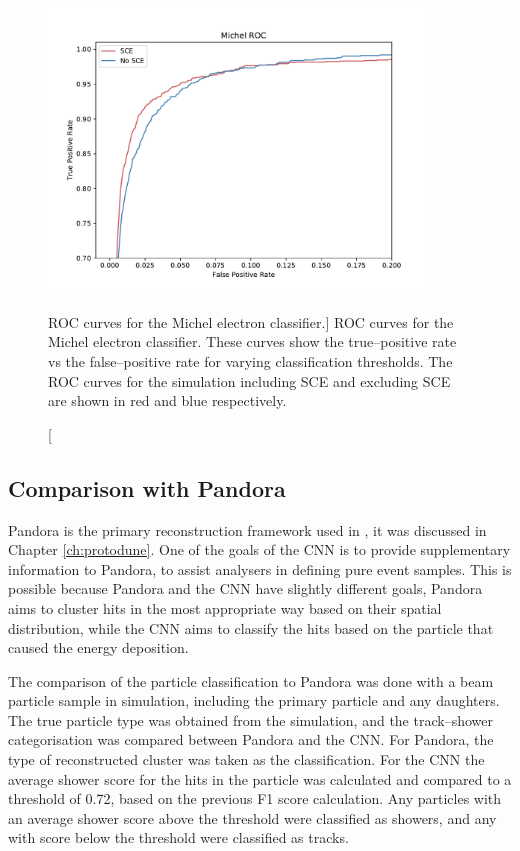 \begin{figure}
	\centering
	\includegraphics[width=0.9\textwidth]{figures/michel_roc_comparison.pdf}
	\caption
	[ROC curves for the Michel electron classifier.]
	{ROC curves for the Michel electron classifier. These curves show
	the true--positive rate vs the false--positive rate for varying classification
	thresholds. The ROC curves for the \protodune{} simulation including SCE and
	excluding SCE are shown in red and blue respectively.}
	\label{fig:michel_roc}
\end{figure}

\subsection{Comparison with Pandora}
Pandora is the primary reconstruction framework used in \protodune{}, it was
discussed in Chapter \ref{ch:protodune}. One of the goals of the CNN is to
provide supplementary information to Pandora, to assist analysers in defining 
pure event samples. This is possible because Pandora and the CNN have slightly
different goals, Pandora aims to cluster hits in the most appropriate way based
on their spatial distribution, while the CNN aims to classify the hits based on 
the particle that caused the energy deposition.

The comparison of the particle classification to Pandora was done with a beam 
particle sample in \protodune{} simulation, including the primary particle and 
any daughters. The true particle type was obtained from the simulation, and 
the track--shower categorisation was compared between Pandora and the CNN. For 
Pandora, the type of reconstructed cluster was taken as the classification. 
For the CNN the average shower score for the hits in the particle was 
calculated and compared to a threshold of 0.72, based on the previous F1 score 
calculation. Any particles with an average shower score above the threshold were
classified as showers, and any with score below the threshold were classified 
as tracks. 

